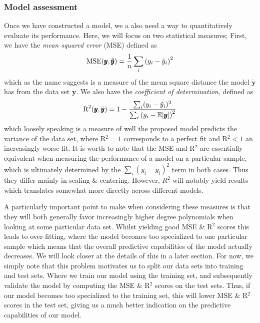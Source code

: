 \documentclass[reprint, english, nofootinbib]{revtex4-2}
\begin{document}
        \subsubsection{Model assessment}
            \noindent
            Once we have constructed a model, we a also need a way to quantitatively evaluate its performance. Here, we will focus on two statistical measures; First, we have the \textit{mean squared error} (MSE) defined as
            \begin{equation}
                \textup{MSE}(\pmb y, \pmb{\tilde y}) = \frac{1}{n}\sum_i \qty(y_i - \tilde y_i)^2
            \end{equation}
            which as the name suggests is a measure of the mean square distance the model $\pmb{\tilde y}$ has from the data set $\pmb y$. We also have the \textit{coefficient of determination}, defined as
            \begin{equation}
                \textup{R}^2(\pmb y, \tilde{\pmb{y}}) = 1 -
                \frac{\sum_i(y_i - \tilde y_i)^2}{\sum_i \qty(y_i - \mathbb E\qty[\pmb y])^2}
            \end{equation}
            which loosely speaking is a measure of well the proposed model predicts the variance of the data set, where R$^2 = 1$ corresponds to a perfect fit and R$^2 < 1$ an increasingly worse fit. It is worth to note that the MSE and R$^2$ are essentially equivalent when measuring the performance of a model on a particular sample, which is ultimately determined by the $\sum_i(y_i - \tilde y_i)^2$ term in both cases. Thus they differ mainly in scaling \& centering. However, $R^2$ will notably yield results which translates somewhat more directly across different models.

            A particularly important point to make when considering these measures is that they will both generally favor increasingly higher degree polynomials when looking at some particular data set. Whilst yielding good MSE \& R$^2$ scores this leads to over-fitting, where the model becomes too specialized to one particular sample which means that the overall predictive capabilities of the model actually decreases. We will look closer at the details of this in a later section. For now, we simply note that this problem motivates us to split our data sets into training and test sets. Where we train our model using the training set, and subsequently validate the model by computing the MSE \& R$^2$ scores on the test sets. Thus, if our model becomes too specialized to the training set, this will lower MSE \& R$^2$ scores in the test set, giving us a much better indication on the predictive capabilities of our model.
\end{document}
